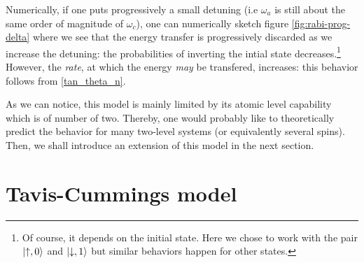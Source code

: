 \documentclass[11pt]{report}
\DeclarePairedDelimiter\ket{\lvert}{\rangle}
\begin{document}
Numerically, if one puts progressively a small detuning (i.e $\omega_a$ is still about the same order of magnitude of $\omega_c$), one can numerically sketch figure \ref{fig:rabi-prog-delta} where we see that the energy transfer is progressively discarded as we increase the detuning: the probabilities of inverting the intial state decreases.\footnote{Of course, it depends on the initial state. Here we chose to work with the pair $\ket{\uparrow, 0}$ and $\ket{\downarrow, 1}$ but similar behaviors happen for other states.} However, the \textit{rate}, at which the energy \textit{may} be transfered, increases: this behavior follows from \eqref{tan_theta_n}.

As we can notice, this model is mainly limited by its atomic level capability which is of number of two. Thereby, one would probably like to theoretically predict the behavior for many two-level systems (or equivalently several spins). Then, we shall introduce an extension of this model in the next section.

\section{Tavis-Cummings model}
\end{document}
